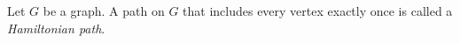 \documentclass[12pt]{article}
\begin{document}
Let $G$ be a graph. A path on $G$ that includes every vertex exactly once is called a \emph{Hamiltonian path}.
\end{document}
